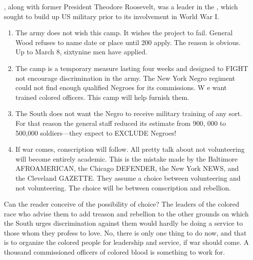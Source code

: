 \documentclass[letterpaper,10pt,english]{jupyterBook}
\begin{document}
\begin{sphinxShadowBox}
\sphinxstylesidebartitle{}

\sphinxAtStartPar
{}, along with  former President Theodore Roosevelt, was a leader in the , which sought to build up US military prior to its involvement in World War I.
\end{sphinxShadowBox}
\begin{enumerate}
%
\item {} 
\sphinxAtStartPar
The army does not wish this camp. It wishes the project to fail. General Wood refuses to name date or place until 200 apply. The reason is obvious. Up to March 8, sixty\sphinxhyphen{}nine men have applied.

\item {} 
\sphinxAtStartPar
The camp is a temporary measure lasting four weeks and designed to FIGHT not encourage discrimina­tion in the army. The New York Negro regiment could not find enough qualified Negroes for its commissions. W e want trained colored officers. This camp will help furnish them.

\item {} 
\sphinxAtStartPar
The South does not want the Negro to receive military training of any sort. For that reason the general staff reduced its estimate from 900,\sphinxhyphen{} 000 to 500,000 soldiers—they expect to EXCLUDE Negroes!

\item {} 
\sphinxAtStartPar
If war comes, conscription will follow. All pretty talk about not vol­unteering will become entirely aca­demic. This is the mistake made by the Baltimore AFRO\sphinxhyphen{}AMERICAN, the Chicago DEFENDER, the New York NEWS, and the Cleveland GAZETTE. They assume a choice between volunteering and not volunteer­ing. The choice will be between con­scription and rebellion.

\end{enumerate}

\sphinxAtStartPar
Can the reader conceive of the pos­sibility of choice? The leaders of the colored race who advise them to add treason and rebellion to the other grounds on which the South urges discrimination against them would hardly be doing a service to those whom they profess to love. No, there is only one thing to do now, and that is to organize the colored people for leadership and service, if war should come. A thousand commissioned officers of colored blood is something to work for.
\end{document}
